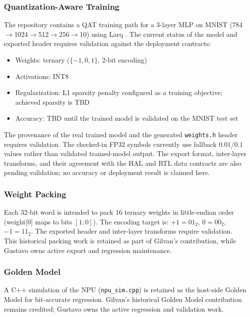 \documentclass[10pt,conference]{IEEEtran}
\begin{document}
\subsubsection*{Quantization-Aware Training}
The repository contains a QAT training path for a 3-layer MLP on MNIST (784$\to$1024$\to$512$\to$256$\to$10) using Larq \cite{larq}. The current status of the model and exported header requires validation against the deployment contracts:

\begin{itemize}
    \item Weights: ternary ($\{-1,0,1\}$, 2-bit encoding)
    \item Activations: INT8
    \item Regularization: L1 sparsity penalty configured as a training objective; achieved sparsity is TBD
    \item Accuracy: TBD until the trained model is validated on the MNIST test set
\end{itemize}

The provenance of the real trained model and the generated \texttt{weights.h} header requires validation. The checked-in FP32 symbols currently use fallback $0.01$/$0.1$ values rather than validated trained-model output. The export format, inter-layer transforms, and their agreement with the HAL and RTL data contracts are also pending validation; no accuracy or deployment result is claimed here.

\subsubsection*{Weight Packing}
Each 32-bit word is intended to pack 16 ternary weights in little-endian order (weight[0] maps to bits $[1:0]$). The encoding target is: $+1 = 01_2$, $0 = 00_2$, $-1 = 11_2$. The exported header and inter-layer transforms require validation. This historical packing work is retained as part of Gilvan's contribution, while Gustavo owns active export and regression maintenance.

\subsubsection*{Golden Model}
A C++ simulation of the NPU (\texttt{npu\_sim.cpp}) is retained as the host-side Golden Model for bit-accurate regression. Gilvan's historical Golden Model contribution remains credited; Gustavo owns the active regression and validation work.

\end{document}
